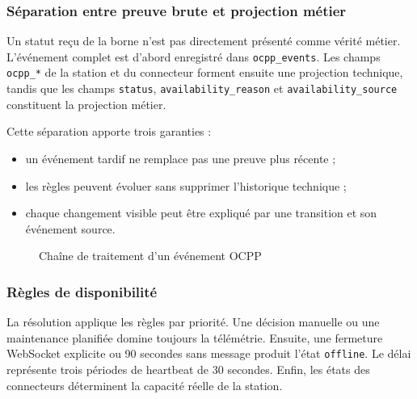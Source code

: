 \subsubsection{Séparation entre preuve brute et projection métier}

Un statut reçu de la borne n'est pas directement présenté comme vérité métier.
L'événement complet est d'abord enregistré dans \texttt{ocpp\_events}. Les champs
\texttt{ocpp\_*} de la station et du connecteur forment ensuite une projection
technique, tandis que les champs \texttt{status}, \texttt{availability\_reason} et
\texttt{availability\_source} constituent la projection métier.

Cette séparation apporte trois garanties :

\begin{itemize}[leftmargin=7mm]
  \item un événement tardif ne remplace pas une preuve plus récente ;
  \item les règles peuvent évoluer sans supprimer l'historique technique ;
  \item chaque changement visible peut être expliqué par une transition et son
  événement source.
\end{itemize}

\begin{figure}[H]
  \centering
  \resizebox{0.98\textwidth}{!}{}
  \caption{Chaîne de traitement d'un événement OCPP}
  \label{fig:availability-pipeline}
\end{figure}

\subsubsection{Règles de disponibilité}

La résolution applique les règles par priorité. Une décision manuelle ou une
maintenance planifiée domine toujours la télémétrie. Ensuite, une fermeture
WebSocket explicite ou 90 secondes sans message produit l'état
\texttt{offline}. Le délai représente trois périodes de heartbeat de 30 secondes.
Enfin, les états des connecteurs déterminent la capacité réelle de la station.

